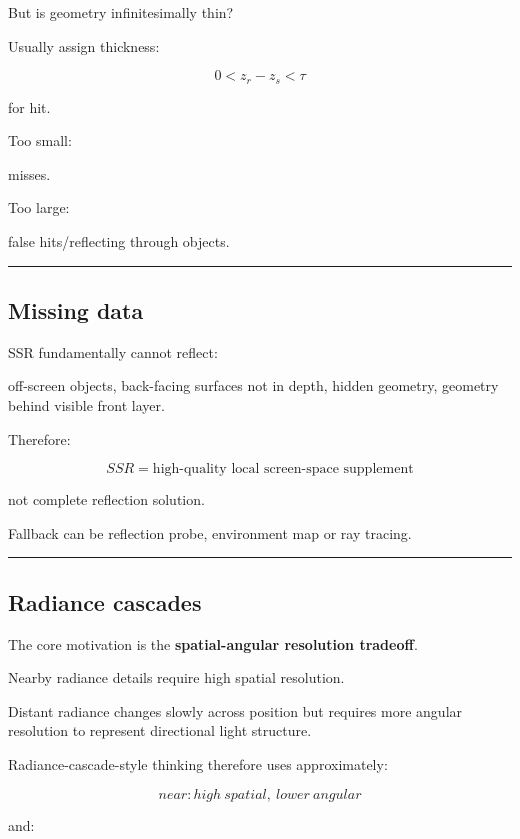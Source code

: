 But is geometry infinitesimally thin?

Usually assign thickness:

\[
0<
z_r-z_s
<
\tau
\]

for hit.

Too small:

misses.

Too large:

false hits/reflecting through objects.

\begin{center}\rule{0.5\linewidth}{0.5pt}\end{center}

\subsection{Missing data}\label{04-visual-computing-ii-ch040-missing-data}

SSR fundamentally cannot reflect:

off-screen objects, back-facing surfaces not in depth, hidden geometry, geometry behind visible front layer.

Therefore:

\[
\boxed{
SSR
=
\text{high-quality local screen-space supplement}
}
\]

not complete reflection solution.

Fallback can be reflection probe, environment map or ray tracing.

\begin{center}\rule{0.5\linewidth}{0.5pt}\end{center}

\subsection{Radiance cascades}\label{04-visual-computing-ii-ch040-radiance-cascades}

The core motivation is the \textbf{spatial-angular resolution tradeoff}.

Nearby radiance details require high spatial resolution.

Distant radiance changes slowly across position but requires more angular resolution to represent directional light structure.

Radiance-cascade-style thinking therefore uses approximately:

\[
\boxed{
near:
high\ spatial,\ lower\ angular
}
\]

and:

